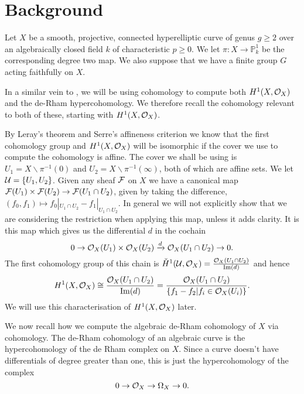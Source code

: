 
\section{Background}

Let $X$ be a smooth, projective, connected hyperelliptic curve of genus $g \geq 2$ over an algebraically closed field $k$ of characteristic $p \geq 0$.
We let $\pi \colon X \rightarrow \mathbb P_k^1$ be the corresponding degree two map.
We also suppose that we have a finite group $G$ acting faithfully on $X$.

In a similar vein to \cite{canonicalrepresentation}, we will be using \cech cohomology to compute both $H^1(X,\mathcal{O}_X)$ and the de-Rham hypercohomology.
We therefore recall the \cech cohomology relevant to both of these, starting with $H^1(X,\mathcal{O}_X)$.

By Leray's theorem \cite[Thm 5.2.12]{liu} and Serre's affineness criterion \cite[Thm 5.2.23]{liu} we know that the first \cech cohomology group and $H^1(X,\mathcal{O}_X)$ will be isomorphic if the cover we use to compute the \cech cohomology is affine.
The cover we shall be using is $U_1 = X\backslash \pi^{-1}(0)$ and $U_2 = X\backslash  \pi^{-1}(\infty) $, both of which are affine sets.
We let ${\cal U} = \{ U_1, U_2\}$.
Given any sheaf $\cal F$ on $X$ we have a canonical map ${\cal F}(U_1) \times {\cal F} (U_2) \rightarrow {\cal F}(U_1 \cap U_2)$, given by taking the difference, $(f_0,f_1) \mapsto f_0|_{U_1 \cap U_2} - f_1|_{U_1 \cap U_2}$.
In general we will not explicitly show that we are considering the restriction when applying this map, unless it adds clarity.
It is this map which gives us the differential $d$ in the \cech cochain
\begin{equation*}
0 \rightarrow {\cal O}_X(U_1)\times {\cal O}_X(U_2) \xrightarrow{d} {\cal O}_X(U_1 \cap U_2) \rightarrow 0.
\end{equation*}
The first cohomology group of this chain is $\check{H}^1(\mathcal U,\mathcal O_X) = \frac{{\cal O}_X(U_1 \cap U_2)}{\operatorname{Im}(d)}$ and hence
\begin{equation}
H^1(X,\mathcal{O}_X) \cong \frac{{\cal O}_X(U_1 \cap U_2)}{\operatorname{Im}(d)}  
 = \frac{{\cal O}_X(U_1 \cap U_2)}{\{f_1 - f_2 | f_i \in {\cal O}_X(U_i) \}}.
\end{equation}
We will use this characterisation of $H^1(X,\mathcal{O}_X)$ later.

We now recall how we compute the algebraic de-Rham cohomology of $X$ via \cech cohomology.
The de-Rham cohomology of an algebraic curve is the hypercohomology of the de Rham complex on $X$. 
Since a curve doesn't have differentials of degree greater than one, this is just the hypercohomology of the complex
\begin{equation}\label{res}
0 \rightarrow {\cal O}_X \rightarrow \Omega_X \rightarrow 0.
\end{equation}

